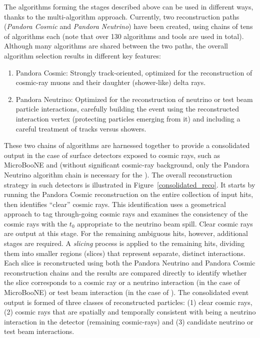 The algorithms forming the stages described above can be used in different ways, thanks to the multi-algorithm approach. Currently, two  reconstruction paths ({\it Pandora Cosmic} and {\it Pandora Neutrino}) have been created, using chains of tens of algorithms each (note that over 130 algorithms and tools are used in total). Although many algorithms are shared between the two paths, the overall algorithm selection results in different key features:
\begin{enumerate}
\item Pandora Cosmic: Strongly track-oriented, optimized for the reconstruction of cosmic-ray muons and their daughter (shower-like) delta rays. 
\item Pandora Neutrino: Optimized for the reconstruction of neutrino or test beam particle interactions, carefully building the event using the reconstructed interaction vertex (protecting particles emerging from it) and including a careful treatment of tracks versus showers. 
\end{enumerate}

These two chains of algorithms are harnessed together to provide a consolidated output in the case of surface detectors exposed to cosmic rays, such as MicroBooNE and  (without significant cosmic-ray background, only the Pandora Neutrino algorithm chain is necessary for the ). The overall reconstruction strategy in such detectors is illustrated in Figure~\ref{consolidated_reco}. It starts by running the Pandora Cosmic reconstruction on the entire collection of input hits, then identifies ``clear'' cosmic rays. This identification uses a geometrical approach to tag through-going cosmic rays and examines the consistency of the cosmic rays with the $t_{0}$ appropriate to the neutrino beam spill. Clear cosmic rays are output at this stage. For the remaining ambiguous hits, however, additional stages are required. A \textit{slicing} process is applied to the remaining hits, dividing them into smaller regions (slices) that represent separate, distinct interactions. Each slice is reconstructed using both the Pandora Neutrino and Pandora Cosmic reconstruction chains and the results are compared directly to identify whether the slice corresponds to a cosmic ray or a neutrino interaction (in the case of MicroBooNE) or test beam interaction (in the case of ). The consolidated event output is formed of three classes of reconstructed particles: (1) clear cosmic rays, (2) cosmic rays that are spatially and temporally consistent with being a neutrino interaction in the detector (remaining cosmic-rays) and (3) candidate neutrino or test beam interactions.

